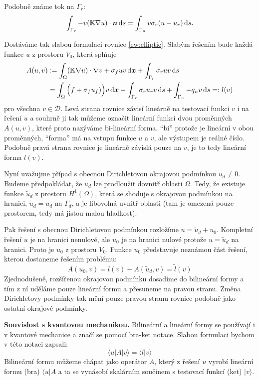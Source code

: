 Podobně známe tok na $\Gamma_r$:
\[
    \int_{\Gamma_r} -v({\mathbb{K}}\nabla u)\cdot \mathbf{\boldsymbol{n}} \,{\rm d} s = \int_{\Gamma_n} v \sigma_r(u - u_r) \,{\rm d} s.
\]

Dostáváme tak slabou formulaci rovnice \eqref{ew:elliptic}. Slabým řešením bude každá funkce $u$ z prostoru $V_0$, 
která splňuje
\begin{align}
    \label{eq:weak_homo_dirich}
    A(u, v) &:= \int_\Omega ({\mathbb{K}}\nabla u) \cdot \nabla v   +   \sigma_f u v \,{\rm d} \mathbf{\boldsymbol{x}} 
              + \int_{\Gamma_r} \sigma_r u v \,{\rm d} s \\
              &=  \int_\Omega \Big(f + \sigma_f u_f)\Big)v \,{\rm d} \mathbf{\boldsymbol{x}} + \int_{\Gamma_r} \sigma_r u_r v \,{\rm d} s 
              + \int_{\Gamma_n} -q_n v \,{\rm d} s =: l(v)
\end{align}
pro všechna $v \in \mathcal D$. Levá strana rovnice závisí lineárně na testovací funkci $v$ i na řešení $u$ 
a souhrně ji tak můžeme označit lineární funkcí dvou proměnných $A(u, v)$, které proto nazýváme bi-lineární forma.
``bi'' protože je lineární v obou proměnných, ``forma'' má na vstupu funkce $u$ a $v$, ale výstupem je reálné číslo.
Podobně pravá strana rovnice je lineárně závislá pouze na $v$, je to tedy lineární forma $l(v)$.

Nyní uvažujme případ s obecnou Dirichletovou okrajovou podmínkou $u_d\ne 0$. 
Budeme předpokládat, že $u_d$ lze prodloužit dovnitř oblasti $\Omega$. Tedy, že existuje 
funkce $\tilde u_d$ z prostoru $H^1(\Omega)$, která se shoduje s okrajovou podmínkou na hranici,
 $\tilde u_d = u_d$ na $\Gamma_d$, a je libovolná uvnitř oblasti (tam je omezená pouze prostorem, tedy má jistou malou hladkost). 
 
 
Pak řešení s obecnou Dirichletovou podmínkou
rozložíme $u = \tilde u_d + u_0$. Kompletní řešení $u$ je na hranici nenulové, ale $u_0$ je na hranici nulové
protože $u=\tilde u_d$ na hranici. Proto je $u_0$ z prostoru $V_0$. Funkce $u_0$ představuje neznámou 
část řešení, kterou dostaneme řešením problému:
\[
    A(u_0, v) = l(v) - A(\tilde u_d, v) = \tilde l(v)
\]
Zjednodušeně, rozšířenou okrajovou podmínku dosadíme do bilineární formy a tím z ní uděláme pouze 
lineární formu a přesuneme na pravou stranu. Změna Dirichletovy podmínky tak mění pouze pravou stranu 
rovnice podobně jako ostatní okrajové podmínky.

{\bf Souvislost s kvantovou mechanikou.} Bilineární a lineární formy se používají i v kvantové mechanice 
a značí se pomocí bra-ket notace. Slabou formulaci bychom v této notaci zapsali:
\[
    \langle u | A | v \rangle = \langle l | v \rangle
\]
Bilineární formu můžeme chápat jako operátor $A$, který z řešení $u$ vyrobí lineární formu (bra) $\langle u| A$ a
ta se vynásobí skalárním součinem s testovací funkcí (ket) $|v\rangle$.


